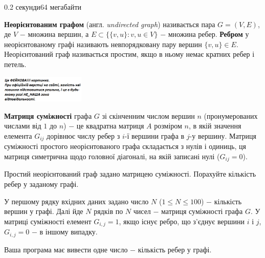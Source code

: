 \begin{problem}{}{}{}{0.2 секунди}{64 мегабайти}

{\bf Неорієнтованим графом} (англ. {\emph{undirected graph}}) називається пара $G=(V,E)$, 
де $V$ $-$ множина вершин, а $E \subset \{\{v,u\}: v,u \in V\}$ $-$ множина ребер.
{\bf Ребром} у неорієнтованому графі називають невпорядковану пару вершин $\{v,u\} \in E$.
Неорієнтований граф називається простим, якщо в ньому немає кратних ребер і петель.

 \begin{center}
    \includegraphics[width=0.30\textwidth,natwidth=232,natheight=217]{pic.png}
  \end{center}

{\bf Матриця суміжності} графа $G$ зі скінченним числом вершин $n$ (пронумерованих числами від $1$ до $n$) $-$ 
це квадратна матриця $A$ розміром $n$, в якій значення елемента $G_{ij}$ дорівнює числу ребер з $i$-ї вершини графа в $j$-у вершину.
Матриця суміжності простого неорієнтованого графа складається з нулів і одиниць,
ця матриця симетрична щодо головної діагоналі, на якій записані нулі ($G_{ij} = 0$).

Простий неорієнтований граф задано матрицею суміжності. Порахуйте кількість ребер у заданому графі.

\InputFile
У першому рядку вхідних даних задано число $N$ ($1 \le N \le 100$) $-$ кількість вершин у графі.
Далі йде $N$ рядків по $N$ чисел $-$ матриця суміжності графа $G$. У матриці суміжності елемент $G_{i,j}=1$, якщо
існує ребро, що з'єднує вершини $i$ і $j$, $G_{i,j}=0$ $-$ в іншому випадку.

\OutputFile
Ваша програма має вивести одне число $-$ кількість ребер у графі.

\Example

\begin{example}
%
\end{example}

\end{problem}

